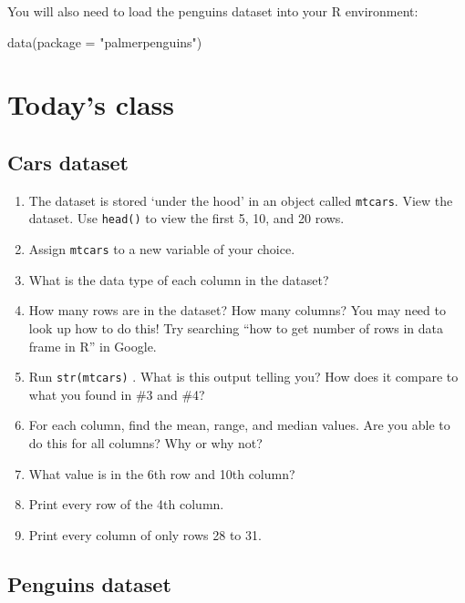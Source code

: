 \documentclass[
  letterpaper,
  DIV=11,
  numbers=noendperiod]{scrreprt}
\newenvironment{Shaded}{\begin{snugshade}}{\end{snugshade}}
\newcommand{\AttributeTok}[1]{\textcolor[rgb]{0.40,0.45,0.13}{#1}}
\newcommand{\FunctionTok}[1]{\textcolor[rgb]{0.28,0.35,0.67}{#1}}
\newcommand{\NormalTok}[1]{\textcolor[rgb]{0.00,0.23,0.31}{#1}}
\newcommand{\StringTok}[1]{\textcolor[rgb]{0.13,0.47,0.30}{#1}}
\providecommand{\tightlist}{%
  \setlength{\itemsep}{0pt}\setlength{\parskip}{0pt}}\usepackage{longtable,booktabs,array}
\begin{document}
You will also need to load the penguins dataset into your R environment:

\begin{Shaded}
\begin{Highlighting}[]
\FunctionTok{data}\NormalTok{(}\AttributeTok{package =} \StringTok{"palmerpenguins"}\NormalTok{)}
\end{Highlighting}
\end{Shaded}

\section{Today's class}\label{todays-class}

\subsection{Cars dataset}\label{cars-dataset}

\begin{enumerate}
\def\labelenumi{\arabic{enumi}.}
\tightlist
\item
  The dataset is stored `under the hood' in an object called
  \texttt{mtcars}. View the dataset. Use \texttt{head()} to view the
  first 5, 10, and 20 rows.
\item
  Assign \texttt{mtcars} to a new variable of your choice.
\item
  What is the data type of each column in the dataset?
\item
  How many rows are in the dataset? How many columns? You may need to
  look up how to do this! Try searching ``how to get number of rows in
  data frame in R'' in Google.
\item
  Run \texttt{str(mtcars)} . What is this output telling you? How does
  it compare to what you found in \#3 and \#4?
\item
  For each column, find the mean, range, and median values. Are you able
  to do this for all columns? Why or why not?
\item
  What value is in the 6th row and 10th column?
\item
  Print every row of the 4th column.
\item
  Print every column of only rows 28 to 31.
\end{enumerate}

\subsection{Penguins dataset}\label{penguins-dataset}
\end{document}
